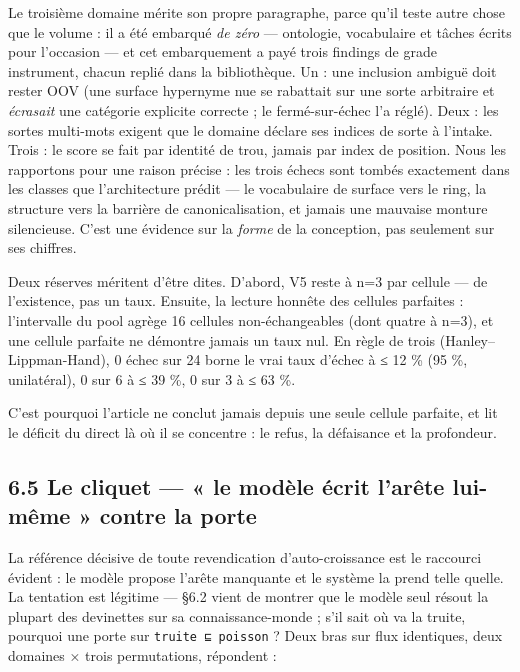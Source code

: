 \documentclass[11pt]{article}
\begin{document}
Le troisième domaine mérite son propre paragraphe, parce qu'il teste autre chose que le volume : il a été embarqué \emph{de zéro} — ontologie, vocabulaire et tâches écrits pour l'occasion — et cet embarquement a payé trois findings de grade instrument, chacun replié dans la bibliothèque. Un : une inclusion ambiguë doit rester OOV (une surface hypernyme nue se rabattait sur une sorte arbitraire et \emph{écrasait} une catégorie explicite correcte ; le fermé-sur-échec l'a réglé). Deux : les sortes multi-mots exigent que le domaine déclare ses indices de sorte à l'intake. Trois : le score se fait par identité de trou, jamais par index de position. Nous les rapportons pour une raison précise : les trois échecs sont tombés exactement dans les classes que l'architecture prédit — le vocabulaire de surface vers le ring, la structure vers la barrière de canonicalisation, et jamais une mauvaise monture silencieuse. C'est une évidence sur la \emph{forme} de la conception, pas seulement sur ses chiffres.

Deux réserves méritent d'être dites. D'abord, V5 reste à n=3 par cellule — de l'existence, pas un taux. Ensuite, la lecture honnête des cellules parfaites : l'intervalle du pool agrège 16 cellules non-échangeables (dont quatre à n=3), et une cellule parfaite ne démontre jamais un taux nul. En règle de trois (Hanley–Lippman-Hand), 0 échec sur 24 borne le vrai taux d'échec à ≤ 12 \% (95 \%, unilatéral), 0 sur 6 à ≤ 39 \%, 0 sur 3 à ≤ 63 \%.

C'est pourquoi l'article ne conclut jamais depuis une seule cellule parfaite, et lit le déficit du direct là où il se concentre : le refus, la défaisance et la profondeur.

\subsection*{6.5 Le cliquet — « le modèle écrit l'arête lui-même » contre la porte}

La référence décisive de toute revendication d'auto-croissance est le raccourci évident : le modèle propose l'arête manquante et le système la prend telle quelle. La tentation est légitime — §6.2 vient de montrer que le modèle seul résout la plupart des devinettes sur sa connaissance-monde ; s'il sait où va la truite, pourquoi une porte sur \texttt{truite ⊑ poisson} ? Deux bras sur flux identiques, deux domaines × trois permutations, répondent :
\end{document}
